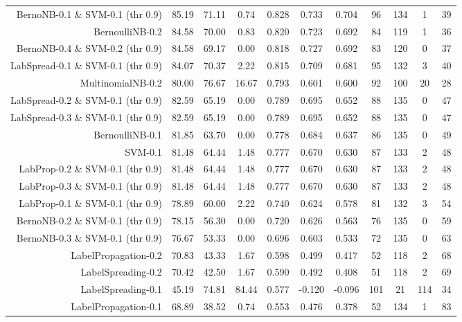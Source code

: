 \begin{table}[!htb]
\begin{tabular}{r|c|c|c|c|c|c|c|c|c|c}
BernoNB-0.1 \& SVM-0.1 (thr 0.9) & 85.19 & 71.11 & 0.74 & 0.828 & 0.733 & 0.704 & 96 & 134 & 1 & 39 \\ 
BernoulliNB-0.2 & 84.58 & 70.00 & 0.83 & 0.820 & 0.723 & 0.692 & 84 & 119 & 1 & 36 \\ 
BernoNB-0.4 \& SVM-0.2 (thr 0.9) & 84.58 & 69.17 & 0.00 & 0.818 & 0.727 & 0.692 & 83 & 120 & 0 & 37 \\ 
LabSpread-0.1 \& SVM-0.1 (thr 0.9) & 84.07 & 70.37 & 2.22 & 0.815 & 0.709 & 0.681 & 95 & 132 & 3 & 40 \\ 
MultinomialNB-0.2 & 80.00 & 76.67 & 16.67 & 0.793 & 0.601 & 0.600 & 92 & 100 & 20 & 28 \\ 
LabSpread-0.2 \& SVM-0.1 (thr 0.9) & 82.59 & 65.19 & 0.00 & 0.789 & 0.695 & 0.652 & 88 & 135 & 0 & 47 \\ 
LabSpread-0.3 \& SVM-0.1 (thr 0.9) & 82.59 & 65.19 & 0.00 & 0.789 & 0.695 & 0.652 & 88 & 135 & 0 & 47 \\ 
BernoulliNB-0.1 & 81.85 & 63.70 & 0.00 & 0.778 & 0.684 & 0.637 & 86 & 135 & 0 & 49 \\ 
SVM-0.1 & 81.48 & 64.44 & 1.48 & 0.777 & 0.670 & 0.630 & 87 & 133 & 2 & 48 \\ 
LabProp-0.2 \& SVM-0.1 (thr 0.9) & 81.48 & 64.44 & 1.48 & 0.777 & 0.670 & 0.630 & 87 & 133 & 2 & 48 \\ 
LabProp-0.3 \& SVM-0.1 (thr 0.9) & 81.48 & 64.44 & 1.48 & 0.777 & 0.670 & 0.630 & 87 & 133 & 2 & 48 \\ 
LabProp-0.1 \& SVM-0.1 (thr 0.9) & 78.89 & 60.00 & 2.22 & 0.740 & 0.624 & 0.578 & 81 & 132 & 3 & 54 \\ 
BernoNB-0.2 \& SVM-0.1 (thr 0.9) & 78.15 & 56.30 & 0.00 & 0.720 & 0.626 & 0.563 & 76 & 135 & 0 & 59 \\ 
BernoNB-0.3 \& SVM-0.1 (thr 0.9) & 76.67 & 53.33 & 0.00 & 0.696 & 0.603 & 0.533 & 72 & 135 & 0 & 63 \\ 
LabelPropagation-0.2 & 70.83 & 43.33 & 1.67 & 0.598 & 0.499 & 0.417 & 52 & 118 & 2 & 68 \\ 
LabelSpreading-0.2 & 70.42 & 42.50 & 1.67 & 0.590 & 0.492 & 0.408 & 51 & 118 & 2 & 69 \\ 
LabelSpreading-0.1 & 45.19 & 74.81 & 84.44 & 0.577 & -0.120 & -0.096 & 101 & 21 & 114 & 34 \\ 
LabelPropagation-0.1 & 68.89 & 38.52 & 0.74 & 0.553 & 0.476 & 0.378 & 52 & 134 & 1 & 83 \\ 
\hline\hline
\end{tabular}
\end{table}
